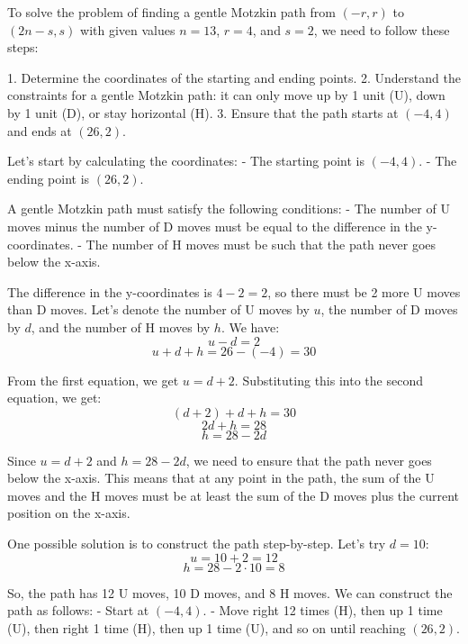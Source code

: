 To solve the problem of finding a gentle Motzkin path from \((-r, r)\) to \((2n-s, s)\) with given values \( n = 13 \), \( r = 4 \), and \( s = 2 \), we need to follow these steps:

1. Determine the coordinates of the starting and ending points.
2. Understand the constraints for a gentle Motzkin path: it can only move up by 1 unit (U), down by 1 unit (D), or stay horizontal (H).
3. Ensure that the path starts at \((-4, 4)\) and ends at \((26, 2)\).

Let's start by calculating the coordinates:
- The starting point is \((-4, 4)\).
- The ending point is \((26, 2)\).

A gentle Motzkin path must satisfy the following conditions:
- The number of U moves minus the number of D moves must be equal to the difference in the y-coordinates.
- The number of H moves must be such that the path never goes below the x-axis.

The difference in the y-coordinates is \(4 - 2 = 2\), so there must be 2 more U moves than D moves. Let's denote the number of U moves by \(u\), the number of D moves by \(d\), and the number of H moves by \(h\). We have:
\[ u - d = 2 \]
\[ u + d + h = 26 - (-4) = 30 \]

From the first equation, we get \(u = d + 2\). Substituting this into the second equation, we get:
\[ (d + 2) + d + h = 30 \]
\[ 2d + h = 28 \]
\[ h = 28 - 2d \]

Since \(u = d + 2\) and \(h = 28 - 2d\), we need to ensure that the path never goes below the x-axis. This means that at any point in the path, the sum of the U moves and the H moves must be at least the sum of the D moves plus the current position on the x-axis.

One possible solution is to construct the path step-by-step. Let's try \(d = 10\):
\[ u = 10 + 2 = 12 \]
\[ h = 28 - 2 \cdot 10 = 8 \]

So, the path has 12 U moves, 10 D moves, and 8 H moves. We can construct the path as follows:
- Start at \((-4, 4)\).
- Move right 12 times (H), then up 1 time (U), then right 1 time (H), then up 1 time (U), and so on until reaching \((26, 2)\).


